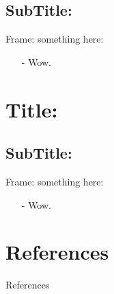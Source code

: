 \documentclass[9pt]{beamer}
\begin{document}
	\subsection[SubTitle]{SubTitle:}
	\begin{frame}{Frame:}
		something here:
		\begin{itemize}
			\item[-] Wow.
		\end{itemize}
	\end{frame}

	\section[Title]{Title:}

	\subsection[SubTitle]{SubTitle:}
	\begin{frame}{Frame:}
		something here:
		\begin{itemize}
			\item[-] Wow.
		\end{itemize}
	\end{frame}



	
	\section*{References}
	\begin{frame}[allowframebreaks]{References}
		
		
	\end{frame}
	
\end{document}
